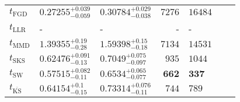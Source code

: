 \begin{tabular}{l|llr|llr}
	\midrule
	$t_{\mathrm{FGD}}$ & ${\mathbf{0.27255_{-0.059}^{+0.039}}}$ & ${\mathbf{0.30784_{-0.038}^{+0.029}}}$ & $7276$ & $16484$ \\
	$t_{\mathrm{LLR}}$ & - & - & - & - \\
	$t_{\mathrm{MMD}}$ & $1.39355_{-0.28}^{+0.19}$ & $1.59398_{-0.18}^{+0.15}$ & $7134$ & $14531$ \\
	$t_{\mathrm{SKS}}$ & $0.62476_{-0.13}^{+0.091}$ & $0.7049_{-0.097}^{+0.075}$ & $935$ & $1044$ \\
	$t_{\mathrm{SW}}$ & $0.57515_{-0.11}^{+0.082}$ & $0.6534_{-0.077}^{+0.065}$ & ${\mathbf{662}}$ & ${\mathbf{337}}$ \\
	$t_{\overline{\mathrm{KS}}}$ & $0.64154_{-0.15}^{+0.1}$ & $0.73314_{-0.11}^{+0.076}$ & $744$ & $789$ \\
	\bottomrule
\end{tabular}